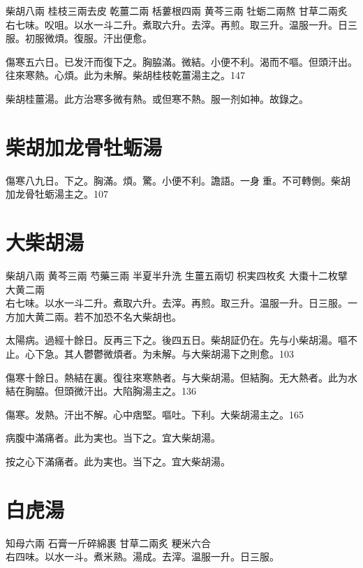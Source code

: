 柴胡{\scriptsize 八兩} 桂枝{\scriptsize 三兩去皮} 乾薑{\scriptsize 二兩} 栝蔞根{\scriptsize 四兩} 黄芩{\scriptsize 三兩} 牡蛎{\scriptsize 二兩熬} 甘草{\scriptsize 二兩炙}\\
右七味。{\khaaitp 㕮咀。}以水一斗二升。煮取六升。去滓。再煎。取三升。温服一升。日三服。初服微煩。{\khaaitp 復服。}汗出{\khaaitp 便}愈。

傷寒五六日。已发汗而復下之。胸脇滿。微結。小便不利。渴而不嘔。但頭汗出。往來寒熱。心煩。此为未解。柴胡桂枝乾薑湯主之。147

柴胡桂薑湯。{\scriptsize 此方治寒多微有熱。或但寒不熱。服一剂如神。故錄之。}

\section{柴胡加龙骨牡蛎湯}

傷寒八九日。下之。胸滿。煩。驚。小便不利。譫語。一身{\khaaitpii 𥁞}{\khaaitp 重。}不可轉側。柴胡加龙骨牡蛎湯主之。107

\section{大柴胡湯}

柴胡{\scriptsize 八兩} 黄芩{\scriptsize 三兩} 芍藥{\scriptsize 三兩} 半夏{\scriptsize 半升洗} 生薑{\scriptsize 五兩切} 枳実{\scriptsize 四枚炙} 大棗{\scriptsize 十二枚擘} {\khaaitp 大黄{\scriptsize 二兩}}\\
右七味。以水一斗二升。煮取六升。去滓。再煎。{\khaaitp 取三升。}温服一升。日三服。一方加大黄二兩。若不加恐不名大柴胡也。

太陽病。過經十餘日。反再三下之。後四五日。柴胡証仍在。先与小柴胡湯。嘔不止。心下急。其人鬱鬱微煩者。为未解。与大柴胡湯下之則愈。103

傷寒十餘日。熱結在裏。復往來寒熱者。与大柴胡湯。但結胸。无大熱者。此为水結在胸脇。{\khaaitp 但}頭微汗出。大陷胸湯主之。136

傷寒。发熱。汗出不解。心中痞堅。嘔吐。下利。大柴胡湯主之。165

病腹中滿痛者。此为実也。当下之。宜大柴胡湯。{\wuben}

按之心下滿痛者。此为実也。当下之。宜大柴胡湯。{\dengben}

\section{白虎湯}

知母{\scriptsize 六兩} 石膏{\scriptsize 一斤碎綿裹} 甘草{\scriptsize 二兩炙} 粳米{\scriptsize 六合}\\
右四味。以水一斗。煮米熟。湯成。去滓。温服一升。日三服。

